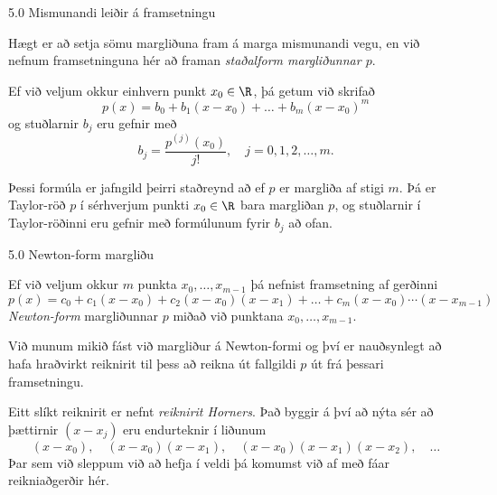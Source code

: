 \begin{frame}{5.0 Mismunandi leiðir á framsetningu} 

Hægt er að setja sömu margliðuna fram á marga mismunandi vegu, en 
við nefnum framsetninguna hér að framan {\em staðalform margliðunnar
  $p$}.

\pause
\smallskip
 Ef við  veljum okkur einhvern punkt $x_0 \in \R$, þá getum við skrifað
\begin{equation*}
	p(x) = b_0 + b_1(x-x_0) + \ldots + b_m(x-x_0)^m
\end{equation*}
og stuðlarnir $b_j$ eru gefnir með
\begin{equation*}
	b_j = \frac{p^{(j)}(x_0)}{j!}, \quad j = 0,1,2,\ldots,m.
\end{equation*}

\pause
\smallskip
Þessi formúla er jafngild þeirri staðreynd að ef $p$ er margliða af stigi
$m$. Þá er Taylor-röð $p$ í sérhverjum punkti $x_0 \in \R$ bara
margliðan $p$, og stuðlarnir í Taylor-röðinni eru gefnir með formúlunum 
fyrir $b_j$ að ofan.
\end{frame}

\begin{frame}{5.0 Newton-form margliðu} 

Ef við veljum okkur $m$ punkta $x_0, \ldots, x_{m-1}$ þá nefnist framsetning af gerðinni
\begin{equation*}
	p(x) = c_0 + c_1(x-x_0) + c_2(x-x_0)(x-x_1)
	+ \ldots + c_m(x-x_0)\cdots(x-x_{m-1})
\end{equation*}
\emph{Newton-form} margliðunnar $p$ miðað við punktana $x_0, \ldots,
x_{m-1}$.

\pause
\smallskip
 Við munum  mikið fást við margliður á Newton-formi og því
er  nauðsynlegt að hafa hraðvirkt reiknirit til þess að reikna út
fallgildi  $p$ út frá þessari framsetningu. 

\pause

\smallskip
Eitt slíkt reiknirit er nefnt 
{\it reiknirit Horners}. Það byggir á því að nýta sér að þættirnir
$(x-x_j)$  eru endurteknir í liðunum
\begin{equation*}
	(x-x_0), \quad (x-x_0)(x-x_1), 
	\quad (x-x_0)(x-x_1)(x-x_2), \quad \ldots
\end{equation*}
Þar sem við sleppum við að hefja í veldi þá komumst við af með 
fáar reikniaðgerðir hér.
\end{frame}

